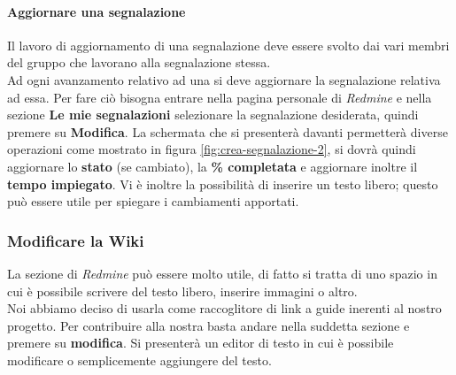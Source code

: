 \documentclass{scalatekids-article}
\begin{document}
\paragraph{Aggiornare una segnalazione}
Il lavoro di aggiornamento di una segnalazione deve essere svolto dai vari
membri del gruppo che lavorano alla segnalazione stessa.\\ Ad ogni avanzamento
relativo ad una  si deve aggiornare la segnalazione relativa ad
essa. Per fare ciò bisogna entrare nella pagina personale di \textit{Redmine} e
nella sezione \textbf{Le mie segnalazioni} selezionare la segnalazione
desiderata, quindi premere su \textbf{Modifica}. La schermata che si presenterà
davanti permetterà diverse operazioni come mostrato in figura
\ref{fig:crea-segnalazione-2}, si dovrà quindi aggiornare lo \textbf{stato} (se
cambiato), la \textbf{\% completata} e aggiornare inoltre il \textbf{tempo
  impiegato}. Vi è inoltre la possibilità di inserire un testo libero; questo
può essere utile per spiegare i cambiamenti apportati.
\subsubsection{Modificare la Wiki}
La sezione  di \textit{Redmine} può essere molto utile, di fatto si tratta di uno spazio in cui è possibile scrivere del testo libero, inserire immagini o altro.\\
Noi abbiamo deciso di usarla come raccoglitore di link a guide inerenti al nostro progetto.
Per contribuire alla nostra  basta andare nella suddetta sezione e premere su \textbf{modifica}. Si presenterà un editor di testo in cui è possibile modificare o semplicemente aggiungere del testo.
\newpage
\appendix
\listoffigures
\end{document}
